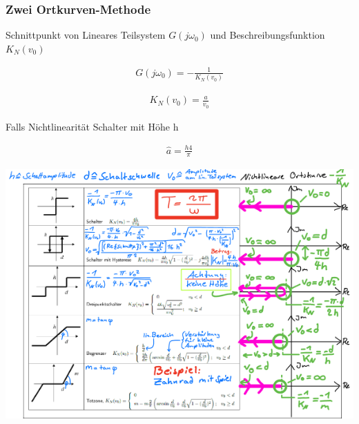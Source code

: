 \documentclass[10pt,a4paper]{article}
\begin{document}
  \subsubsection{Zwei Ortkurven-Methode}
  Schnittpunkt von Lineares Teilsystem $G(j\omega_0)$ und Beschreibungsfunktion $K_N(v_0)$
  \begin{mdframed}[style=exercise]
    \begin{align}
        G(j\omega_0) = -\frac{1}{K_N(v_0)}
    \end{align}
  \end{mdframed}

  \begin{mdframed}[style=exercise]
    \begin{align}
        K_N(v_0) = \frac{a}{v_0}
    \end{align}
  \end{mdframed}
Falls Nichtlinearität Schalter mit Höhe h
  \begin{mdframed}[style=exercise]
    \begin{align}
        \hat{a}= \frac{h4}{\pi}
    \end{align}
  \end{mdframed}

  \clearpage
  \begin{center}
      \includegraphics[width=1.\textwidth]{./img/K_N.png}
  \end{center}
\end{document}
